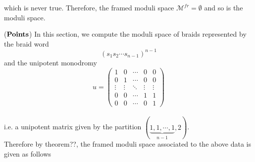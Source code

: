 \begin{example}
which is never true. Therefore, the framed moduli  space $\mathcal{M}^{fr}=\emptyset$ and so is the moduli space.
\end{example}

\begin{example}
($\bf{Points}$) In this section, we compute the moduli space of braids represented by the braid word \[(s_1s_2\cdots s_{n-1})^{n-1}\] and the unipotent monodromy 
\[u= 
\begin{pmatrix}
	1&0&\cdots&0&0\\
	0&1&\cdots&0&0\\
	\vdots&\vdots&\ddots&\vdots&\vdots\\
	0&0&\cdots&1&1\\
	0&0&\cdots&0&1
\end{pmatrix}
\] \\
i.e. a unipotent matrix given by the partition $(\underbrace{1,1,\cdots,1}_{n-1},2)$.
\\
Therefore by theorem??, the framed moduli space associated to the above data is given as follows \\


\end{example}
